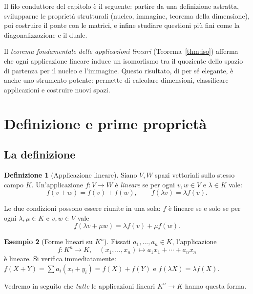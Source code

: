 \documentclass[11pt, a4paper]{book}
\theoremstyle{definition}
\newtheorem{definizione}{Definizione}[section]
\newtheorem{esempio}[definizione]{Esempio}
\theoremstyle{plain}
\theoremstyle{remark}
\begin{document}
Il filo conduttore del capitolo è il seguente: partire da una definizione astratta, svilupparne le proprietà strutturali (nucleo, immagine, teorema della dimensione), poi costruire il ponte con le matrici, e infine studiare questioni più fini come la diagonalizzazione e il duale.

Il \emph{teorema fondamentale delle applicazioni lineari} (Teorema~\ref{thm:iso}) afferma che ogni applicazione lineare induce un isomorfismo tra il quoziente dello spazio di partenza per il nucleo e l'immagine. Questo risultato, di per sé elegante, è anche uno strumento potente: permette di calcolare dimensioni, classificare applicazioni e costruire nuovi spazi.

\section{Definizione e prime proprietà}
\label{sec:defapplin}

\subsection{La definizione}

\begin{defbox}
\begin{definizione}[Applicazione lineare]
\label{def:applin}
Siano $V, W$ spazi vettoriali sullo stesso campo $K$. Un'applicazione $f \colon V \to W$ è \emph{lineare} se per ogni $v, w \in V$ e $\lambda \in K$ vale:
\[
  f(v + w) = f(v) + f(w), \qquad f(\lambda v) = \lambda f(v).
\]
\end{definizione}
\end{defbox}

Le due condizioni possono essere riunite in una sola: $f$ è lineare se e solo se per ogni $\lambda, \mu \in K$ e $v, w \in V$ vale
\[
  f(\lambda v + \mu w) = \lambda f(v) + \mu f(w).
\]

\begin{exbox}
\begin{esempio}[Forme lineari su $K^n$]
Fissati $a_1, \ldots, a_n \in K$, l'applicazione
\[
  f \colon K^n \to K, \quad (x_1, \ldots, x_n) \mapsto a_1 x_1 + \cdots + a_n x_n
\]
è lineare. Si verifica immediatamente: $f(X+Y) = \sum a_i(x_i+y_i) = f(X)+f(Y)$ e $f(\lambda X) = \lambda f(X)$.

Vedremo in seguito che \emph{tutte} le applicazioni lineari $K^n \to K$ hanno questa forma.
\end{esempio}
\end{exbox}
\end{document}
